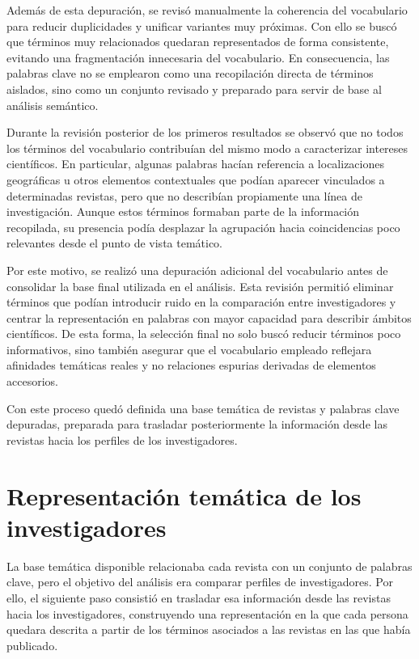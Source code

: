 \documentclass[11pt,spanish,listoffigures,listoftables]{tfgetsinf}
\begin{document}
Además de esta depuración, se revisó manualmente la coherencia del vocabulario para reducir duplicidades y unificar variantes muy próximas. Con ello se buscó que términos muy relacionados quedaran representados de forma consistente, evitando una fragmentación innecesaria del vocabulario. En consecuencia, las palabras clave no se emplearon como una recopilación directa de términos aislados, sino como un conjunto revisado y preparado para servir de base al análisis semántico.

Durante la revisión posterior de los primeros resultados se observó que no todos los términos del vocabulario contribuían del mismo modo a caracterizar intereses científicos. En particular, algunas palabras hacían referencia a localizaciones geográficas u otros elementos contextuales que podían aparecer vinculados a determinadas revistas, pero que no describían propiamente una línea de investigación. Aunque estos términos formaban parte de la información recopilada, su presencia podía desplazar la agrupación hacia coincidencias poco relevantes desde el punto de vista temático.

Por este motivo, se realizó una depuración adicional del vocabulario antes de consolidar la base final utilizada en el análisis. Esta revisión permitió eliminar términos que podían introducir ruido en la comparación entre investigadores y centrar la representación en palabras con mayor capacidad para describir ámbitos científicos. De esta forma, la selección final no solo buscó reducir términos poco informativos, sino también asegurar que el vocabulario empleado reflejara afinidades temáticas reales y no relaciones espurias derivadas de elementos accesorios.

Con este proceso quedó definida una base temática de revistas y palabras clave depuradas, preparada para trasladar posteriormente la información desde las revistas hacia los perfiles de los investigadores.

\section{Representación temática de los investigadores}

La base temática disponible relacionaba cada revista con un conjunto de palabras clave, pero el objetivo del análisis era comparar perfiles de investigadores. Por ello, el siguiente paso consistió en trasladar esa información desde las revistas hacia los investigadores, construyendo una representación en la que cada persona quedara descrita a partir de los términos asociados a las revistas en las que había publicado.
\end{document}
